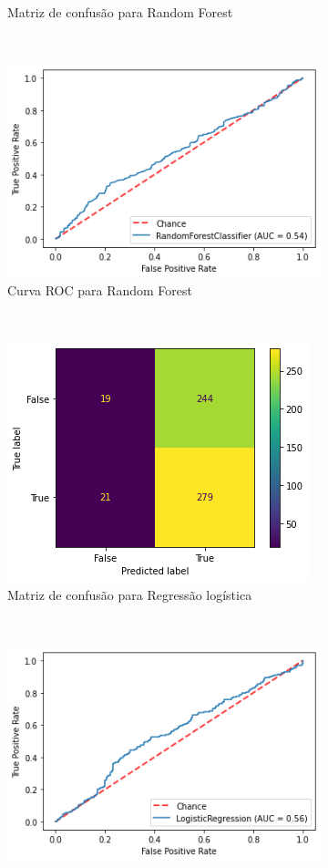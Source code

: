 \begin{figure}[htb]
\begin{subfigure}[b]{0.45\textwidth}
        \caption{Matriz de confusão para Random Forest}
        \label{fig:resultadosbase-de-dados-28.3.1-confusion-matrix-randomforest-total-cnae}
    \end{subfigure} ~ \quad
    \begin{subfigure}[b]{0.45\textwidth}
        \includegraphics[scale=0.55]{images/base-de-dados-28.4.2-roc-curve-randomforest-total-cnae.png}
        \caption{Curva ROC para Random Forest}
        \label{fig:resultados:base-de-dados-28.3.2-roc-curve-randomforest-total-cnae}
    \end{subfigure} ~ \\
    \begin{subfigure}[b]{0.45\textwidth}
        \includegraphics[scale=0.55]{images/base-de-dados-28.4.7-confusion-matrix-logregression-total-cnae.png}
        \caption{Matriz de confusão para Regressão logística}
        \label{fig:resultados:base-de-dados-28.3.7-confusion-matrix-logregression-total-cnae}
    \end{subfigure} ~ \quad
    \begin{subfigure}[b]{0.45\textwidth}
        \includegraphics[scale=0.55]{images/base-de-dados-28.4.8-roc-curve-logregression-total-cnae.png}

\end{subfigure}
\end{figure}

